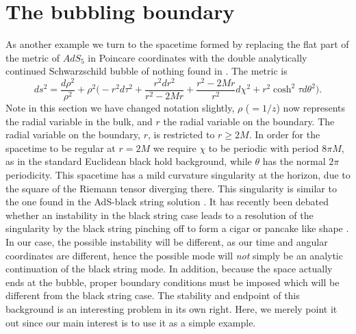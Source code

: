 \documentclass[a4paper,aps,prd,preprintnumbers,groupedaddress]{revtex4}
\begin{document}
\section{The bubbling boundary}
\label{Schwars}

As another example we turn to the spacetime formed by replacing the flat part of the metric of $AdS_5$ in Poincare
coordinates with the double analytically continued Schwarzschild bubble of nothing found in \cite{silv02}. The metric is
\begin{equation}
\label{s bubble metric} ds^2=\frac{d \rho^2}{\rho^2} + \rho^2 \biggl( -r^2 d \tau^2 + \frac{r^2dr^2}{r^2-2Mr} + \frac{r^2-2Mr}{r^2} {d
\chi^2} + r^2 \cosh ^2 \tau d \theta^2 \biggr) .
\end{equation}
Note in this section we have changed notation slightly, $\rho$ ($=1/z$) now represents the radial variable in the bulk, and $r$ the radial
variable on the boundary. The radial variable on the boundary, $r$, is restricted to $r\geq 2M$. In order for the spacetime to be regular at
$r=2M$ we require $\chi$ to be periodic with period $8 \pi M$, as in the standard Euclidean black hold background, while $\theta$ has the
normal $2 \pi$ periodicity. This spacetime has a mild curvature singularity at the horizon, due to the square of the Riemann tensor
diverging there. This singularity is similar to the one found in the AdS-black string solution \cite{chamblin99}. It has recently been
debated whether an instability in the black string case leads to a resolution of the singularity by the black string pinching off to form a
cigar or pancake like shape \cite{gregory00,gibbons02}. In our case, the possible instability will be different, as our time and angular
coordinates are different, hence the possible mode will {\it not} simply be an analytic continuation of the black string mode. In addition,
because the space actually ends at the bubble, proper boundary conditions must be imposed which will be different from the black string
case. The stability and endpoint of this background is an interesting problem in its own right. Here, we merely point it out since our main
interest is to use it as a simple example.
\end{document}
